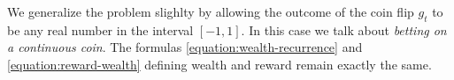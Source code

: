 We generalize the problem slighlty by allowing the outcome of the coin flip
$g_t$ to be any real number in the interval $[-1,1]$. In this case we talk about
\emph{betting on a continuous coin}. The formulas
\eqref{equation:wealth-recurrence} and \eqref{equation:reward-wealth} defining
wealth and reward remain exactly the same.
